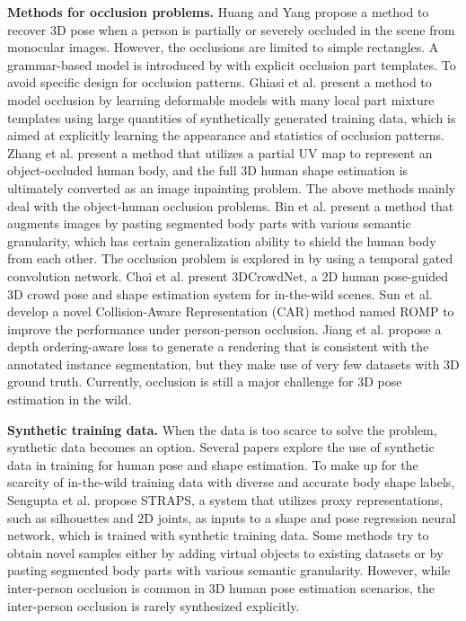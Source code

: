 \documentclass[journal]{IEEEtran}
\begin{document}
\noindent\textbf{Methods for occlusion problems.} Huang and Yang \cite{huang2009estimating} propose a method to recover 3D pose when a person is partially or severely occluded in the scene from monocular images. However, the occlusions are limited to simple rectangles. A grammar-based model is introduced by \cite{girshick2011object} with explicit occlusion part templates. To avoid specific design for occlusion patterns. Ghiasi et al. \cite{ghiasi2014parsing} present a method to model occlusion by learning deformable models with many local part mixture templates using large quantities of synthetically generated training data, which is aimed at explicitly learning the appearance and statistics of occlusion patterns. Zhang et al. \cite{zhang2020object} present a method that utilizes a partial UV map to represent an object-occluded human body, and the full 3D human shape estimation is ultimately converted as an image inpainting problem. The above methods mainly deal with the object-human occlusion problems. Bin et al. \cite{bin2020adversarial} present a method that augments images by pasting segmented body parts with various semantic granularity, which has certain generalization ability to shield the human body from each other. The occlusion problem is explored in \cite{gu2021exploring} by using a temporal gated convolution network. Choi et al. \cite{lin2021end-to-end} present 3DCrowdNet, a 2D human pose-guided 3D crowd pose and shape estimation system for in-the-wild scenes. Sun et al. \cite{ROMP} develop a novel Collision-Aware Representation (CAR) method named ROMP to improve the performance under person-person occlusion. Jiang et al. \cite{jiang2020coherent} propose a depth ordering-aware loss to generate a rendering that is consistent with the annotated instance segmentation, but they make use of very few datasets with 3D ground truth. Currently, occlusion is still a major challenge for 3D pose estimation in the wild.  

\noindent\textbf{Synthetic training data.} When the data is too scarce to solve the problem, synthetic data becomes an option. Several papers explore the use of synthetic data in training for human pose and shape estimation. To make up for the scarcity of in-the-wild training data with diverse and accurate body shape labels, Sengupta et al. \cite{STRAPS2020BMVC} propose STRAPS, a system that utilizes proxy representations, such as silhouettes and 2D joints, as inputs to a shape and pose regression neural network, which is trained with synthetic training data. Some methods \cite{bin2020adversarial,zhang2020object} try to obtain novel samples either by adding virtual objects to existing datasets or by pasting segmented body parts with various semantic granularity. However, while inter-person occlusion is common in 3D human pose estimation scenarios, the inter-person occlusion is rarely synthesized explicitly. 
\end{document}
